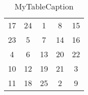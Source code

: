 \documentclass[preview,border=10]{standalone}
\begin{document}

\begin{table}[h]
\centering
\begin{tabular}{ccccc}
17 & 24 & 1 & 8 & 15 \\
23 & 5 & 7 & 14 & 16 \\
4 & 6 & 13 & 20 & 22 \\
10 & 12 & 19 & 21 & 3 \\
11 & 18 & 25 & 2 & 9 \\
\end{tabular}
\caption{MyTableCaption}
\label{table:MyTableLabel}
\end{table}

\end{document}
